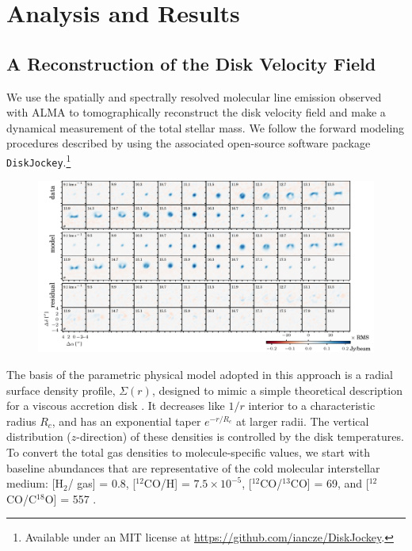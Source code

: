 \documentclass[twocolumn]{aastex61}
\begin{document}
\section{Analysis and Results}

\subsection{A Reconstruction of the Disk Velocity Field}
\label{sec:disk}
We use the spatially and spectrally resolved molecular line emission observed with ALMA to tomographically reconstruct the disk velocity field and make a dynamical measurement of the total stellar mass. We follow the forward modeling procedures described by \citet{czekala15a,czekala16} using the associated open-source software package {\tt DiskJockey}.\footnote{Available under an MIT license at \url{https://github.com/iancze/DiskJockey}.}

\begin{figure}[ht!]
\begin{center}
  \includegraphics{chmaps_13CO.pdf}
  \end{center}
\end{figure}

The basis of the parametric physical model adopted in this approach is a radial surface density profile, $\Sigma(r)$, designed to mimic a simple theoretical description for a viscous accretion disk \citep{lyndenbell74,hartmann98}.  It decreases like $1/r$ interior to a characteristic radius $R_c$, and has an exponential taper $e^{-r/R_c}$ at larger radii.  The vertical distribution ($z$-direction) of these densities is controlled by the disk temperatures. To convert the total gas densities to molecule-specific values, we start with baseline abundances that are representative of the cold molecular interstellar medium: [H$_2$/ gas] = 0.8, [$^{12}$CO/H] = $7.5 \times 10^{-5}$, [$^{12}$CO/$^{13}$CO] = 69, and [$^{12}$CO/C$^{18}$O] = 557 \citep[e.g.,][]{henkel94,prantzos96}.
\end{document}
